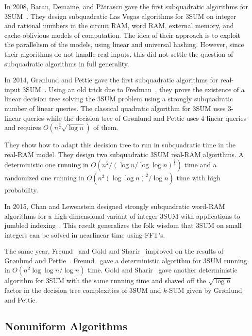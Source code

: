 In 2008, Baran, Demaine, and P{\u a}tra{\cb s}cu
gave the first subquadratic algorithms for
3SUM~\cite{BDP08}. They design subquadratic Las Vegas
algorithms for 3SUM on integer and
rational numbers in the circuit RAM, word RAM, external memory, and
cache-oblivious models of computation. The idea of their approach is to exploit
the parallelism of the models, using linear and universal hashing. However,
since their algorithms do not handle real inputs,
this did not settle the question of subquadratic algorithms in full
generality.

In 2014, Gr{\o}nlund and Pettie gave
the first subquadratic algorithms for real-input 3SUM~\cite{GP18}.
Using an old trick due to Fredman~\cite{Fr76},
they prove the existence of a linear decision tree
solving the 3SUM problem using a strongly subquadratic number of linear queries.
The classical quadratic algorithm for 3SUM uses \(3\)-linear queries
while the decision tree of Gr{\o}nlund and Pettie uses \(4\)-linear queries and
requires $O(n^{\frac{3}{2}} \sqrt{\log n})$ of them.


They show how to adapt this decision tree to run in subquadratic time in the
real-RAM model. They design two subquadratic 3SUM
real-RAM algorithms. A deterministic one running in
$O(n^2/{(\log n/\log \log n)}^{\frac{2}{3}})$
time and a randomized one running in
$O(n^2 {(\log \log n)}^2 / \log n)$ time with high probability.

In 2015, Chan and Lewenstein designed strongly subquadratic word-RAM algorithms
for a high-dimensional variant of integer 3SUM with applications to jumbled
indexing~\cite{CL15}. This result generalizes the folk wisdom that 3SUM on small
integers can be solved in nearlinear time using FFT's.

The same year, Freund~\cite{Fr15} and Gold and Sharir~\cite{GS15}
improved on the results of Gr{\o}nlund and Pettie~\cite{GP18}.
Freund~\cite{Fr15} gave a deterministic algorithm for 3SUM running in \(O(
{n^2\log \log n}/{\log n})\) time. Gold and Sharir~\cite{GS15} gave another
deterministic algorithm for 3SUM with the same running time and shaved off the
$\sqrt{\log n}$ factor in the decision tree complexities of 3SUM and \(k\)-SUM
given by Gr{\o}nlund and Pettie.
%


\subsection{Nonuniform Algorithms}%
\label{sec:history:sum:nonuniform-algorithms}

